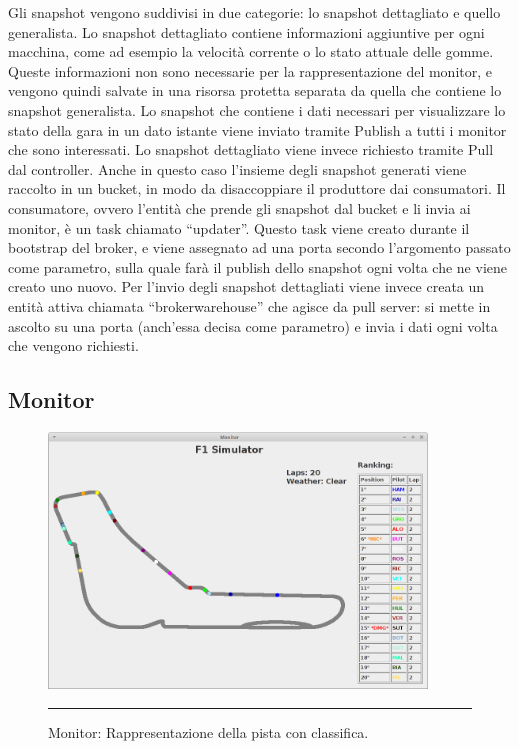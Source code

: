 Gli snapshot vengono suddivisi in due categorie: lo snapshot dettagliato e quello generalista. Lo snapshot dettagliato contiene informazioni aggiuntive per ogni macchina, come ad esempio la velocità corrente o lo stato attuale delle gomme. Queste informazioni non sono necessarie per la rappresentazione del monitor, e vengono quindi salvate in una risorsa protetta separata da quella che contiene lo snapshot generalista.
Lo snapshot che contiene i dati necessari per visualizzare lo stato della gara in un dato istante viene inviato tramite Publish a tutti  i monitor che sono interessati. Lo snapshot dettagliato viene invece richiesto tramite Pull dal controller.
Anche in questo caso l’insieme degli snapshot generati viene raccolto in un bucket, in modo da disaccoppiare il produttore dai consumatori. 
Il consumatore, ovvero l’entità che prende gli snapshot dal bucket e li invia ai monitor, è un task chiamato “updater”. Questo task viene creato durante il bootstrap del broker, e viene assegnato ad una porta secondo l’argomento passato come parametro, sulla quale farà il publish dello snapshot ogni volta che ne viene creato uno nuovo.
Per l’invio degli snapshot dettagliati viene invece creata un entità attiva chiamata “broker\textunderscore warehouse” che agisce da pull server: si mette in ascolto su una porta (anch’essa decisa come parametro) e invia i dati ogni volta che vengono richiesti.

\subsection{Monitor}

\begin{figure}[htbp]
	\centering
		\includegraphics[keepaspectratio = true, width = 380px] {Pictures/monitor}
		\rule{35em}{0.5pt}
	\caption[Monitor]{Monitor: Rappresentazione della pista con classifica.}
	\label{fig:Monitor}
\end{figure}

